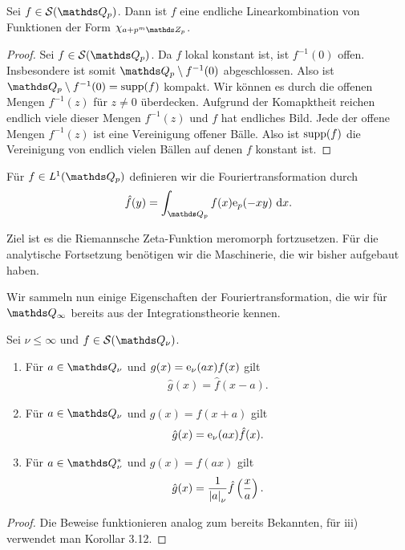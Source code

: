 \begin{prop}
Sei $f \in \Sq$. Dann ist $f$ eine endliche Linearkombination von Funktionen der Form $\chi_{a+p^m\Z_p}$.
\end{prop}
\begin{proof}
Sei $f \in \Sq$. Da $f$ lokal konstant ist, ist $f^{-1}(0)$ offen.
Insbesondere ist somit $\Q_p \setminus f^{-1}(0)$ abgeschlossen.
Also ist $\Q_p\setminus f^{-1}(0)=\supp(f)$ kompakt.
Wir können es durch die offenen Mengen $f^{-1}(z)$ für $z \not =0$ überdecken.
Aufgrund der Komapktheit reichen endlich viele dieser Mengen $f^{-1}(z)$ und $f$ hat endliches Bild.
Jede der offene Mengen $f^{-1}(z)$ ist eine Vereinigung offener Bälle.
Also ist $\operatorname{supp}(f)$ die Vereinigung von endlich vielen Bällen auf denen $f$ konstant ist.
\end{proof}


\begin{defi}
Für $f\in \mathit{L}^1(\Q_p)$ definieren wir die Fouriertransformation durch
\begin{align*}
	\hat{f}(y)=\int_{\Q_p} f(x)\ex_p(-xy)~\mathrm{d}x.
\end{align*}
\end{defi}

Ziel ist es die Riemannsche Zeta-Funktion meromorph fortzusetzen.
Für die analytische Fortsetzung benötigen wir die Maschinerie, die wir bisher aufgebaut haben.

Wir sammeln nun einige Eigenschaften der Fouriertransformation, die wir für $\Q_\infty$ bereits aus der Integrationstheorie kennen.

\begin{prop}
Sei $\nu \leq \infty$ und $f \in \mathcal{S}(\Q_\nu)$.
\begin{enumerate}[label=\roman*)]
\item Für $a \in \Q_\nu$ und $g(x)=\mathrm{e}_\nu(ax)f(x)$ gilt
\begin{align*}
	\hat{g}(x)=\hat{f}(x-a).
\end{align*}
\item Für $a \in\Q_\nu$ und $g(x)=f(x+a)$ gilt
\begin{align*}
	\hat{g}(x)=\mathrm{e}_\nu(ax)\hat{f}(x).
\end{align*}
\item Für $a \in \Q_\nu^\ast$ und $g(x)=f(ax)$ gilt
\begin{align*}
	\hat{g}(x)=\frac{1}{\left\vert a\right\vert_\nu}\hat{f}\left(\frac{x}{a}\right).
\end{align*}
\end{enumerate}
\end{prop}
\begin{proof}
Die Beweise funktionieren analog zum bereits Bekannten, für iii) verwendet man Korollar 3.12.
\end{proof}

